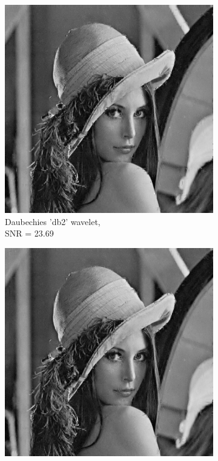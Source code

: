 \begin{figure}
\begin{subfigure}[b]{0.4\textwidth}
        \includegraphics[width=\textwidth]{../src/inpainting/vraag_2_4_db2}
        \caption{Daubechies 'db2' wavelet, \\ SNR = 23.69 }
        \label{fig:matti_fig_db2}
    \end{subfigure}
    \begin{subfigure}[b]{0.4\textwidth}
        \includegraphics[width=\textwidth]{../src/inpainting/vraag_2_4_db6}

\end{subfigure}
\end{figure}
